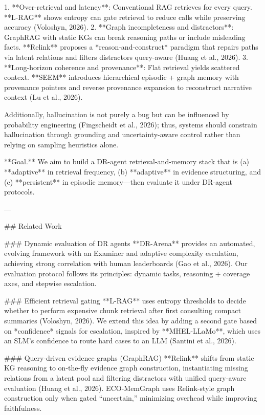 1. **Over-retrieval and latency**: Conventional RAG retrieves for every query. **L-RAG** shows entropy can gate retrieval to reduce calls while preserving accuracy (Voloshyn, 2026).  
2. **Graph incompleteness and distractors**: GraphRAG with static KGs can break reasoning paths or include misleading facts. **Relink** proposes a *reason-and-construct* paradigm that repairs paths via latent relations and filters distractors query-aware (Huang et al., 2026).  
3. **Long-horizon coherence and provenance**: Flat retrieval yields scattered context. **SEEM** introduces hierarchical episodic + graph memory with provenance pointers and reverse provenance expansion to reconstruct narrative context (Lu et al., 2026).

Additionally, hallucination is not purely a bug but can be influenced by probability engineering (Fingscheidt et al., 2026); thus, systems should constrain hallucination through grounding and uncertainty-aware control rather than relying on sampling heuristics alone.

**Goal.** We aim to build a DR-agent retrieval-and-memory stack that is (a) **adaptive** in retrieval frequency, (b) **adaptive** in evidence structuring, and (c) **persistent** in episodic memory—then evaluate it under DR-agent protocols.

---

## Related Work  

### Dynamic evaluation of DR agents  
**DR-Arena** provides an automated, evolving framework with an Examiner and adaptive complexity escalation, achieving strong correlation with human leaderboards (Gao et al., 2026). Our evaluation protocol follows its principles: dynamic tasks, reasoning + coverage axes, and stepwise escalation.

### Efficient retrieval gating  
**L-RAG** uses entropy thresholds to decide whether to perform expensive chunk retrieval after first consulting compact summaries (Voloshyn, 2026). We extend this idea by adding a second gate based on *confidence* signals for escalation, inspired by **MHEL-LLaMo**, which uses an SLM’s confidence to route hard cases to an LLM (Santini et al., 2026).

### Query-driven evidence graphs (GraphRAG)  
**Relink** shifts from static KG reasoning to on-the-fly evidence graph construction, instantiating missing relations from a latent pool and filtering distractors with unified query-aware evaluation (Huang et al., 2026). ECO-MemGraph uses Relink-style graph construction only when gated “uncertain,” minimizing overhead while improving faithfulness.

